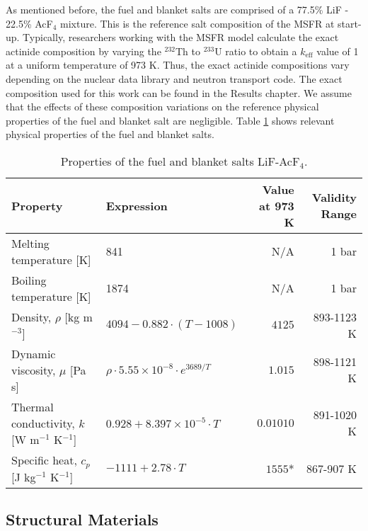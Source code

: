 As mentioned before, the fuel and blanket salts are comprised of a 77.5\% LiF
- 22.5\% AcF$_4$ mixture. This is the reference salt composition of the
\gls{MSFR} at start-up. Typically, researchers working with the \gls{MSFR}
model calculate the exact actinide composition by varying the $^{232}$Th to
$^{233}$U ratio to obtain a $k_{\text{eff}}$ value of 1 at a uniform
temperature of 973 K. Thus, the exact actinide compositions vary depending on
the nuclear data library and neutron transport code. The exact composition
used for this work can be found in the Results chapter. We assume that the
effects of these composition variations on the reference physical properties
of the fuel and blanket salt are negligible. Table \ref{table:prip} shows
relevant physical properties of the fuel and blanket salts.
%
\begin{table}[htb!]
\small
\centering
\caption{Properties of the fuel and blanket salts LiF-AcF$_4$.}
\begin{tabular}{l l r r}
\toprule
Property & Expression & {Value at 973 K} & Validity Range\\
\midrule
Melting temperature [K] & 841 & {N/A} & 1 bar \\
Boiling temperature [K] & 1874 & {N/A} & 1 bar \\
Density, $\rho$ [kg m$^{-3}$] & $4094-0.882 \cdot (T-1008)$ & $4125$ & 893-1123 K \\
Dynamic viscosity, $\mu$ [Pa s] & $\rho \cdot 5.55 \times 10^{-8} \cdot e^{3689/T}$ & $1.015$ & 898-1121 K \\
Thermal conductivity, $k$ [W m$^{-1}$ K$^{-1}$] & $0.928+8.397 \times 10^{-5} \cdot T$ & $0.01010$ & 891-1020 K \\
Specific heat, $c_p$ [J kg$^{-1}$ K$^{-1}$] & $-1111+2.78\cdot T$ & $1555$* & 867-907 K \\
\bottomrule
\end{tabular}
\label{table:prip}
\end{table}

\subsection{Structural Materials}

